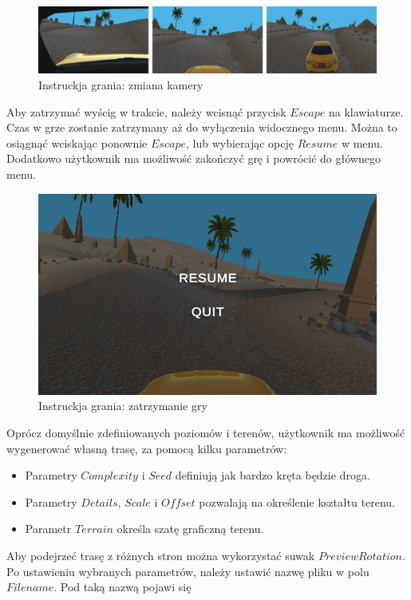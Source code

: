    \begin{figure}[H]
        \centering
        \includegraphics[width=\textwidth]{figures/game_instruction_camera_switch.png}
        \caption{Instruckja grania: zmiana kamery}
        \label{fig}
    \end{figure}
    Aby zatrzymać wyścig w trakcie, należy wcisnąć przycisk $Escape$ na klawiaturze. Czas w grze zostanie zatrzymany aż do wyłączenia widocznego menu.
    Można to osiągnąć wciskając ponownie $Escape$, lub wybierając opcję $Resume$ w menu. Dodatkowo użytkownik ma możliwość zakończyć grę i powrócić
    do głównego menu.
    \begin{figure}[H]
        \centering
        \includegraphics[width=.8\textwidth]{figures/game_instruction_pause.png}
        \caption{Instruckja grania: zatrzymanie gry}
        \label{fig}
    \end{figure}
    Oprócz domyślnie zdefiniowanych poziomów i terenów, użytkownik ma możliwość wygenerować własną trasę, za pomocą kilku parametrów:
    \begin{itemize}
        \item Parametry $Complexity$ i $Seed$ definiują jak bardzo kręta będzie droga.
        \item Parametry $Details$, $Scale$ i $Offset$ pozwalają na określenie kształtu terenu.
        \item Parametr $Terrain$ określa szatę graficzną terenu.
    \end{itemize}
    Aby podejrzeć trasę z różnych stron można wykorzystać suwak $Preview Rotation$.\\
    Po ustawieniu wybranych parametrów, należy ustawić nazwę pliku w polu $Filename$. Pod taką nazwą pojawi się 
